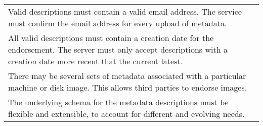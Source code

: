 \begin{table}
\begin{center}
\begin{tabular}{p{}}
\\ Valid descriptions must contain a valid email address.  The
  service must confirm the email address for every upload of metadata.

\\ All valid descriptions must contain a creation date for the
  endorsement.  The server must only accept descriptions with a
  creation date more recent that the current latest.

\\ There may be several sets of metadata associated with a
  particular machine or disk image. This allows third parties to
  endorse images.

\\ The underlying schema for the metadata descriptions must be
  flexible and extensible, to account for different and evolving
  needs.

\\
\hline\hline
\end{tabular}
\end{center}
\end{table}
